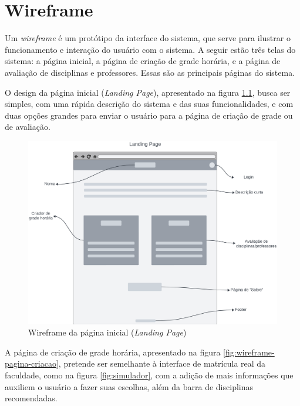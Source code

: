 \chapter{Wireframe}
\label{cha:Wireframe}

Um \textit{wireframe} é um protótipo da interface do sistema, que serve para ilustrar o funcionamento e interação do usuário com o sistema. A seguir estão três telas do sistema: a página inicial, a página de criação de grade horária, e a página de avaliação de disciplinas e professores. Essas são as principais páginas do sistema.

O design da página inicial (\textit{Landing Page}), apresentado na figura \ref{fig:wireframe-pagina-inicial}, busca ser simples, com uma rápida descrição do sistema e das suas funcionalidades, e com duas opções grandes para enviar o usuário para a página de criação de grade ou de avaliação.

\begin{figure}[ht]
    \begin{center}
    \includegraphics[width=390pt]{figuras/pagina-inicial.png}
    \caption{Wireframe da página inicial (\textit{Landing Page})}
    \label{fig:wireframe-pagina-inicial}
    \end{center}
\end{figure}

A página de criação de grade horária, apresentado na figura \ref{fig:wireframe-pagina-criacao}, pretende ser semelhante à interface de matrícula real da faculdade, como na figura \ref{fig:simulador}, com a adição de mais informações que auxiliem o usuário a fazer suas escolhas, além da barra de disciplinas recomendadas.

